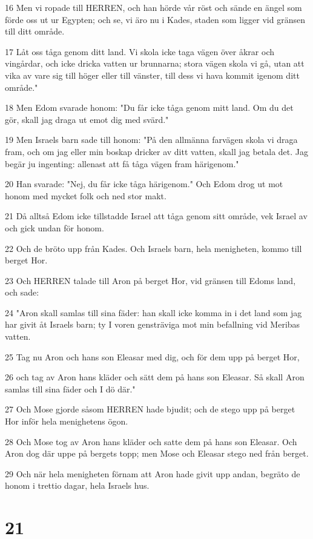 \par 16 Men vi ropade till HERREN, och han hörde vår röst och sände en ängel som förde oss ut ur Egypten; och se, vi äro nu i Kades, staden som ligger vid gränsen till ditt område.
\par 17 Låt oss tåga genom ditt land. Vi skola icke taga vägen över åkrar och vingårdar, och icke dricka vatten ur brunnarna; stora vägen skola vi gå, utan att vika av vare sig till höger eller till vänster, till dess vi hava kommit igenom ditt område."
\par 18 Men Edom svarade honom: "Du får icke tåga genom mitt land. Om du det gör, skall jag draga ut emot dig med svärd."
\par 19 Men Israels barn sade till honom: "På den allmänna farvägen skola vi draga fram, och om jag eller min boskap dricker av ditt vatten, skall jag betala det. Jag begär ju ingenting: allenast att få tåga vägen fram härigenom."
\par 20 Han svarade: "Nej, du får icke tåga härigenom." Och Edom drog ut mot honom med mycket folk och ned stor makt.
\par 21 Då alltså Edom icke tillstadde Israel att tåga genom sitt område, vek Israel av och gick undan för honom.
\par 22 Och de bröto upp från Kades. Och Israels barn, hela menigheten, kommo till berget Hor.
\par 23 Och HERREN talade till Aron på berget Hor, vid gränsen till Edoms land, och sade:
\par 24 "Aron skall samlas till sina fäder: han skall icke komma in i det land som jag har givit åt Israels barn; ty I voren gensträviga mot min befallning vid Meribas vatten.
\par 25 Tag nu Aron och hans son Eleasar med dig, och för dem upp på berget Hor,
\par 26 och tag av Aron hans kläder och sätt dem på hans son Eleasar. Så skall Aron samlas till sina fäder och I dö där."
\par 27 Och Mose gjorde såsom HERREN hade bjudit; och de stego upp på berget Hor inför hela menighetens ögon.
\par 28 Och Mose tog av Aron hans kläder och satte dem på hans son Eleasar. Och Aron dog där uppe på bergets topp; men Mose och Eleasar stego ned från berget.
\par 29 Och när hela menigheten förnam att Aron hade givit upp andan, begräto de honom i trettio dagar, hela Israels hus.

\chapter{21}

